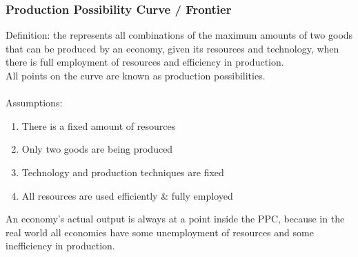\subsubsection*{Production Possibility Curve / Frontier}
Definition: the  represents all combinations of the maximum amounts of two goods that can be produced by an economy, given its resources and technology, when there is full employment of resources and efficiency in production. \\
All points on the curve are known as production possibilities.\\\\
Assumptions:
\begin{enumerate}
  \item There is a fixed amount of resources
  \item Only two goods are being produced
  \item Technology and production techniques are fixed
  \item All resources are used efficiently \& fully employed
\end{enumerate}
An economy's actual output is always at a point inside the PPC, because in the real world all economies have some unemployment of resources and some inefficiency in production.

